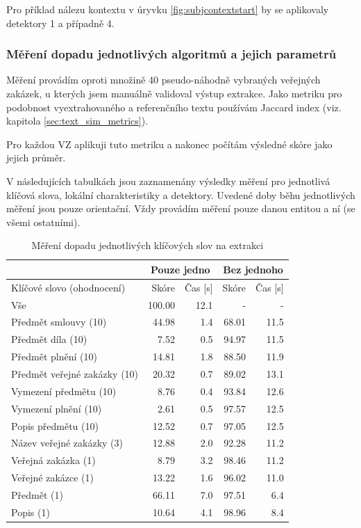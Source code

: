 \documentclass[thesis=M,czech]{FITthesis}[2019/12/23]
\newenvironment{example}{\begin{adjustwidth}{1cm}{}}{\end{adjustwidth}}
\begin{document}
\begin{example}
    Pro příklad nálezu kontextu v úryvku \ref{fig:subjcontextstart} by se aplikovaly detektory 1 a případně 4.
\end{example}

\subsubsection{Měření dopadu jednotlivých algoritmů a jejich parametrů}

Měření provádím oproti množině 40 pseudo-náhodně vybraných veřejných zakázek, u kterých jsem manuálně validoval výstup extrakce. Jako metriku pro podobnost vyextrahovaného a referenčního textu používám Jaccard index (viz. kapitola \ref{sec:text_sim_metrics}).

Pro každou VZ aplikuji tuto metriku a nakonec počítám výsledné skóre jako jejich průměr.

V následujících tabulkách jsou zaznamenány výsledky měření pro jednotlivá klíčová slova, lokální charakteristiky a detektory. Uvedené doby běhu jednotlivých měření jsou pouze orientační. Vždy provádím měření pouze  danou entitou a  ní (se všemi ostatními).

\begin{table}[h!]
\centering
\begin{tabular}{ |l|r|r|r|r| }
\hline
 & \multicolumn{2}{|c|}{Pouze jedno} & \multicolumn{2}{|c|}{Bez jednoho} \\\hline
Klíčové slovo (ohodnocení) & Skóre & Čas [s] & Skóre & Čas [s] \\\hline
\hline
Vše & 100.00 & 12.1 & - & - \\\hline
Předmět smlouvy (10) & 44.98 & 1.4 & 68.01 & 11.5 \\
Předmět díla (10) & 7.52 & 0.5 & 94.97 & 11.5\\
Předmět plnění (10) & 14.81 & 1.8 & 88.50 & 11.9\\
Předmět veřejné zakázky (10) & 20.32  & 0.7 & 89.02 & 13.1\\\hline
Vymezení předmětu (10) & 8.76 & 0.4 & 93.84 & 12.6\\
Vymezení plnění (10) & 2.61 & 0.5 & 97.57 & 12.5\\
Popis předmětu (10) & 12.52 & 0.7 & 97.05 & 12.5\\
Název veřejné zakázky (3) & 12.88 & 2.0 & 92.28 & 11.2\\\hline
Veřejná zakázka (1) & 8.79 & 3.2 & 98.46 & 11.2\\
Veřejné zakázce (1) & 13.22 & 1.6 & 96.02 & 11.0\\
Předmět (1) & 66.11 & 7.0 & 97.51 & 6.4\\
Popis (1) & 10.64 & 4.1 & 98.96 & 8.4\\\hline
\end{tabular}
\caption{Měření dopadu jednotlivých klíčových slov na extrakci}
\label{table:experiment_subj_keywords}
\end{table}
\end{document}
